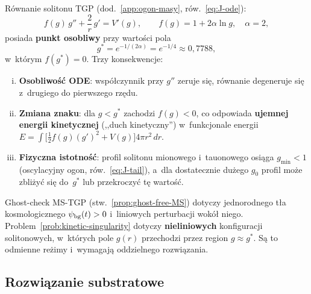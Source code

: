 \begin{problem}%
\label{prob:kinetic-singularity}
Równanie solitonu TGP (dod.~\ref{app:ogon-masy},
ró{}w.~\eqref{eq:J-ode}):
\begin{equation}\label{eq:ghost-ode}
  f(g)\,g'' + \frac{2}{r}\,g' = V'(g),
  \qquad
  f(g) = 1 + 2\alpha\ln g,
  \quad \alpha = 2,
\end{equation}
posiada \textbf{punkt osobliwy} przy wartości pola
\begin{equation}\label{eq:gstar}
  g^* = e^{-1/(2\alpha)} = e^{-1/4} \approx 0{,}7788,
\end{equation}
w~którym $f(g^*) = 0$. Trzy konsekwencje:
\begin{enumerate}[(i)]
  \item \textbf{Osobliwość ODE}: współczynnik przy $g''$
    zeruje się, równanie degeneruje się
    z~drugiego do pierwszego rzędu.
  \item \textbf{Zmiana znaku}: dla $g < g^*$ zachodzi $f(g) < 0$,
    co odpowiada \textbf{ujemnej energii kinetycznej}
    (,,duch kinetyczny'') w~funkcjonale energii
    $E = \int\!\bigl[\tfrac{1}{2}f(g)(g')^2 + V(g)\bigr]
    4\pi r^2\,dr$.
  \item \textbf{Fizyczna istotność}: profil solitonu mionowego
    i~tauonowego osiąga $g_{\min} < 1$
    (oscylacyjny ogon, ró{}w.~\eqref{eq:J-tail}),
    a~dla dostatecznie dużego $g_0$ profil może
    zbliżyć się do~$g^*$ lub przekroczyć tę wartość.
\end{enumerate}
\end{problem}

\begin{remark}\label{rem:ghost-scope}
Ghost-check MS-TGP (stw.~\ref{prop:ghost-free-MS})
dotyczy jednorodnego tła kosmologicznego $\psi_{\rm bg}(t) > 0$
i~liniowych perturbacji wokół niego. Problem~\ref{prob:kinetic-singularity}
dotyczy \textbf{nieliniowych} konfiguracji solitonowych,
w~których pole $g(r)$ przechodzi przez region $g \approx g^*$.
Są to odmienne reżimy i~wymagają oddzielnego rozwiązania.
\end{remark}

\subsection{Rozwiązanie substratowe}\label{ssec:substrate-resolution}

